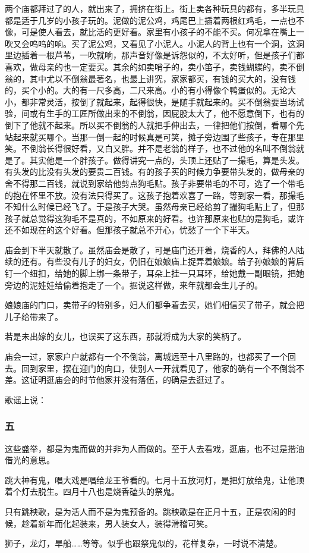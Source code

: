 \par 两个庙都拜过了的人，就出来了，拥挤在街上。街上卖各种玩具的都有，多半玩具都是适于几岁的小孩子玩的。泥做的泥公鸡，鸡尾巴上插着两根红鸡毛，一点也不像，可是使人看去，就比活的更好看。家里有小孩子的不能不买。何况拿在嘴上一吹又会呜呜的响。买了泥公鸡，又看见了小泥人。小泥人的背上也有一个洞，这洞里边插着一根芦苇，一吹就响，那声音好像是诉怨似的，不太好听，但是孩子们都喜欢，做母亲的也一定要买。其余的如卖哨子的，卖小笛子，卖钱蝴蝶的，卖不倒翁的，其中尤以不倒翁最著名，也最上讲究，家家都买，有钱的买大的，没有钱的，买个小的。大的有一尺多高，二尺来高。小的有小得像个鸭蛋似的。无论大小，都非常灵活，按倒了就起来，起得很快，是随手就起来的。买不倒翁要当场试验，间或有生手的工匠所做出来的不倒翁，因屁股太大了，他不愿意倒下，也有的倒下了他就不起来。所以买不倒翁的人就把手伸出去，一律把他们按倒，看哪个先站起来就买哪个。当那一倒一起的时候真是可笑，摊子旁边围了些孩子，专在那里笑。不倒翁长得很好看，又白又胖。并不是老翁的样子，也不过他的名叫不倒翁就是了。其实他是一个胖孩子。做得讲究一点的，头顶上还贴了一撮毛，算是头发。有头发的比没有头发的要贵二百钱。有的孩子买的时候力争要带头发的，做母亲的舍不得那二百钱，就说到家给他剪点狗毛贴。孩子非要带毛的不可，选了一个带毛的抱在怀里不放。没有法只得买了。这孩子抱着欢喜了一路，等到家一看，那撮毛不知什么时候已经飞了。于是孩子大哭。虽然母亲已经给剪了撮狗毛贴上了，但那孩子就总觉得这狗毛不是真的，不如原来的好看。也许那原来也贴的是狗毛，或许还不如现在的这个好看。但那孩子就总不开心，忧愁了一个下半天。
\par 庙会到下半天就散了。虽然庙会是散了，可是庙门还开着，烧香的人，拜佛的人陆续的还有。有些没有儿子的妇女，仍旧在娘娘庙上捉弄着娘娘。给子孙娘娘的背后钉一个纽扣，给她的脚上绑一条带子，耳朵上挂一只耳环，给她戴一副眼镜，把她旁边的泥娃娃给偷着抱走了一个。据说这样做，来年就都会生儿子的。
\par 娘娘庙的门口，卖带子的特别多，妇人们都争着去买，她们相信买了带子，就会把儿子给带来了。
\par 若是未出嫁的女儿，也误买了这东西，那就将成为大家的笑柄了。
\par 庙会一过，家家户户就都有一个不倒翁，离城远至十八里路的，也都买了一个回去。回到家里，摆在迎门的向口，使别人一开就看见了，他家的确有一个不倒翁不差。这证明逛庙会的时节他家并没有落伍，的确是去逛过了。
\par 歌谣上说：
\subsubsection*{五}
\par 这些盛举，都是为鬼而做的并非为人而做的。至于人去看戏，逛庙，也不过是揩油借光的意思。
\par 跳大神有鬼，唱大戏是唱给龙王爷看的。七月十五放河灯，是把灯放给鬼，让他顶着个灯去脱生。四月十八也是烧香磕头的祭鬼。
\par 只有跳秧歌，是为活人而不是为鬼预备的。跳秧歌是在正月十五，正是农闲的时候，趁着新年而化起装来，男人装女人，装得滑稽可笑。
\par 狮子，龙灯，旱船……等等。似乎也跟祭鬼似的，花样复杂，一时说不清楚。

